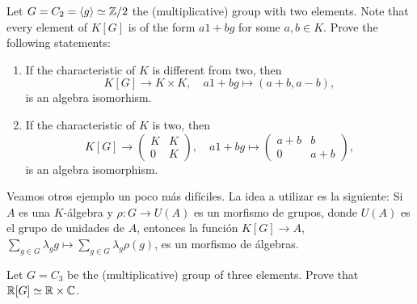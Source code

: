 
\begin{exercise}
	Let $G=C_2=\langle g\rangle\simeq\mathbb{Z}/2$ the (multiplicative) 
	group with two elements. Note that every element of $K[G]$ is of the form
	$a1+bg$ for some $a,b\in K$. Prove the following statements:
	\begin{enumerate}
	    \item If the characteristic of $K$ is different from two, then 
	    \[
		K[G]\to K\times K,
		\quad
		a1+bg\mapsto (a+b,a-b),
	\]
	is an algebra isomorhism. 
	\item If the characteristic of $K$ is two, then 
	\[
	K[G]\to \begin{pmatrix}
			K & K\\
			0 & K
		\end{pmatrix},
		\quad
		a1+bg\mapsto\begin{pmatrix}
			a+b & b\\
			0 & a+b
		\end{pmatrix},
	\]
	is an algebra isomorphism. 
	\end{enumerate}
\end{exercise}

Veamos otros ejemplo un poco más difíciles. La idea a utilizar es la siguiente:
Si $A$ es una $K$-álgebra y $\rho\colon G\to U(A)$ es un morfismo de grupos,
donde $U(A)$ es el grupo de unidades de $A$, entonces la función $K[G]\to A$,
$\sum_{g\in G}\lambda_gg\mapsto\sum_{g\in G}\lambda_g\rho(g)$, es un morfismo
de álgebras.

\begin{exercise}
	Let $G=C_3$ be the (multiplicative) group of three elements. Prove that
	$\mathbb{R}[G]\simeq\mathbb{R}\times\mathbb{C}$.
\end{exercise}

